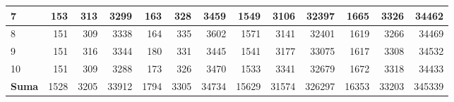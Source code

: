 \begin{table}[bh]
{{\begin{tabular}{|l|r|r|r|r|r|r|r|r|r|r|r|r|}
		7                                                             & 153                              & 313                               & 3299                               & 163                              & 328                               & 3459                               & 1549                             & 3106                              & 32397                              & 1665                             & 3326                              & 34462                              \\ \hline
		8                                                             & 151                              & 309                               & 3338                               & 164                              & 335                               & 3602                               & 1571                             & 3141                              & 32401                              & 1619                             & 3266                              & 34469                              \\ \hline
		9                                                             & 151                              & 316                               & 3344                               & 180                              & 331                               & 3445                               & 1541                             & 3177                              & 33075                              & 1617                             & 3308                              & 34532                              \\ \hline
		10                                                            & 151                              & 309                               & 3288                               & 173                              & 326                               & 3470                               & 1533                             & 3341                              & 32679                              & 1672                             & 3318                              & 34433                              \\ \hline\hline
		\textbf{Suma}                                                 & 1528                          & 3205                           & 33912                           & 1794                          & 3305                           & 34734                           & 15629                         & 31574                          & 326297                          & 16353                         & 33203                          & 345339                          \\ \hline

\end{tabular}}}
\end{table}
